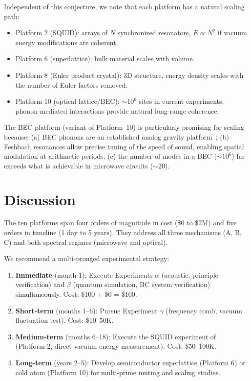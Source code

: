\documentclass[11pt,a4paper]{article}
\begin{document}
Independent of this conjecture, we note that each platform
has a natural scaling path:
\begin{itemize}
\item Platform 2 (SQUID): arrays of $N$ synchronized resonators,
  $E \propto N^2$ if vacuum energy modifications are coherent.
\item Platform 6 (superlattice): bulk material scales with volume.
\item Platform 8 (Euler product crystal): 3D structure, energy
  density scales with the number of Euler factors removed.
\item Platform 10 (optical lattice/BEC): $\sim 10^6$ sites
  in current experiments; phonon-mediated interactions provide
  natural long-range coherence.
\end{itemize}

The BEC platform (variant of Platform~10) is particularly
promising for scaling because: (a) BEC phonons are an
established analog gravity platform~\cite{Unruh1981};
(b) Feshbach resonances allow precise tuning of the speed
of sound, enabling spatial modulation at arithmetic periods;
(c) the number of modes in a BEC ($\sim 10^6$) far exceeds
what is achievable in microwave circuits ($\sim 20$).

\section{Discussion}
\label{sec:discussion}

The ten platforms span four orders of magnitude in cost
(\$0 to \$2M) and five orders in timeline (1 day to 5 years).
They address all three mechanisms (A, B, C) and both spectral
regimes (microwave and optical).

We recommend a multi-pronged experimental strategy:
\begin{enumerate}
\item \textbf{Immediate} (month 1):
  Execute Experiments $\alpha$ (acoustic, principle verification)
  and $\beta$ (quantum simulation, BC system verification)
  simultaneously. Cost: \$100 + \$0 = \$100.
\item \textbf{Short-term} (months 1--6):
  Pursue Experiment $\gamma$ (frequency comb, vacuum fluctuation test).
  Cost: \$10--50K.
\item \textbf{Medium-term} (months 6--18):
  Execute the SQUID experiment of~\cite{paper_A}
  (Platform 2, direct vacuum energy measurement).
  Cost: \$50--100K.
\item \textbf{Long-term} (years 2--5):
  Develop semiconductor superlattice (Platform 6) or
  cold atom (Platform 10) for multi-prime muting and scaling studies.
\end{enumerate}
\end{document}
